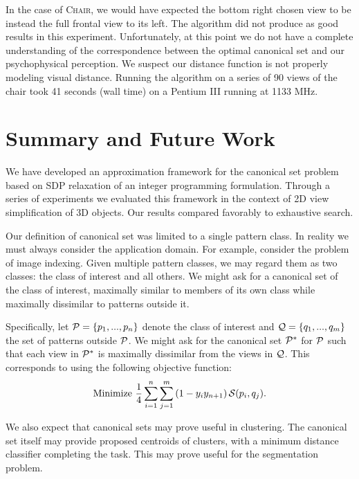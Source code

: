 \documentclass{ieee}
\def\P{{\cal P}}
\def\Q{{\cal Q}}
\def\S{{\cal S}}
\begin{document}
In the case of \textsc{Chair}, we would have expected the bottom right
chosen view to be instead the full frontal view to its left. The
algorithm did not produce as good results in this experiment.
Unfortunately, at this point we do not have a complete understanding
of the correspondence between the optimal canonical set and our
psychophysical perception. We suspect our distance function is not
properly modeling visual distance.
Running the algorithm on a series of 90 views of the chair took 41
seconds (wall time) on a Pentium III running at 1133 MHz.
\vspace{-0.1in}
\section{Summary and Future Work}
\label{sec:conclusion}

\vspace{-0.1in}
We have developed an approximation framework for the canonical set
problem based on SDP relaxation of an integer programming formulation.
Through a series of experiments we evaluated this framework in the
context of 2D view simplification of 3D objects. Our results compared
favorably to exhaustive search.

Our definition of canonical set was limited to a single pattern class.
In reality we must always consider the application domain. For
example, consider the problem of image indexing.
Given multiple pattern classes, we may regard them as two
classes: the class of interest and all others. We might ask for a
canonical set of the class of interest, maximally similar to members
of its own class while maximally dissimilar to patterns outside it.

Specifically, let $\P=\{p_1,...,p_n\}$ denote the class of interest
and $\Q=\{q_1,...,q_m\}$ the set of patterns outside $\P$. We might ask
for the canonical set $\P^*$ for $\P$ such that each view in $\P^*$ is
maximally dissimilar from the views in $\Q$. This corresponds to using
the following objective function:
\begin{displaymath}
  \mbox{Minimize\ }
  \frac 1 4 \sum_{i=1}^n \sum_{j=1}^m \left(1-y_iy_{n+1}\right)\S(p_i,q_j).
\end{displaymath}

We also expect that canonical sets may prove useful in clustering. The
canonical set itself may provide proposed centroids of clusters, with
a minimum distance classifier completing the task. This may prove
useful for the segmentation problem.
\end{document}
